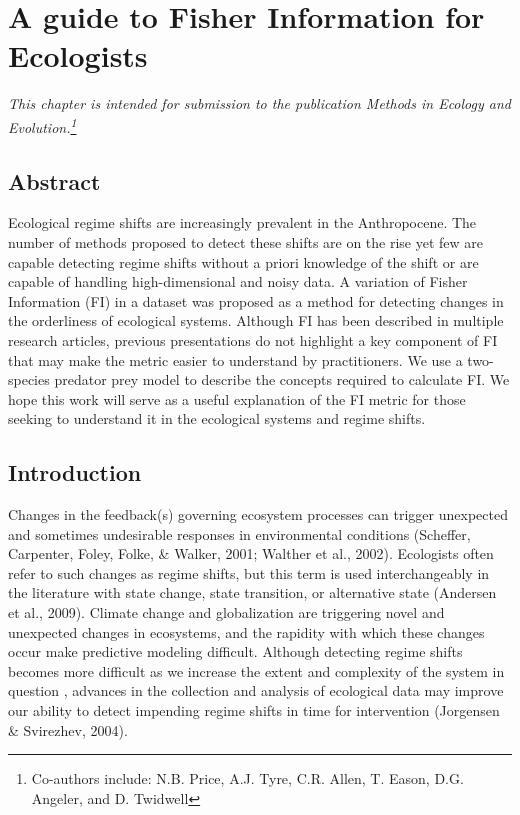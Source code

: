 \documentclass[12pt,twoside,openany]{reedthesis}
\begin{document}
\hypertarget{fiGuide}{%
\chapter{A guide to Fisher Information for Ecologists}\label{fiGuide}}

\emph{This chapter is intended for submission to the publication \emph{Methods in Ecology and Evolution}.\footnote{Co-authors include: N.B. Price, A.J. Tyre, C.R. Allen, T. Eason, D.G. Angeler, and D. Twidwell}}

\hypertarget{abstract-1}{%
\section{Abstract}\label{abstract-1}}

Ecological regime shifts are increasingly prevalent in the Anthropocene. The number of methods proposed to detect these shifts are on the rise yet few are capable detecting regime shifts without a priori knowledge of the shift or are capable of handling high-dimensional and noisy data. A variation of Fisher Information (FI) in a dataset was proposed as a method for detecting changes in the orderliness of ecological systems. Although FI has been described in multiple research articles, previous presentations do not highlight a key component of FI that may make the metric easier to understand by practitioners. We use a two-species predator prey model to describe the concepts required to calculate FI. We hope this work will serve as a useful explanation of the FI metric for those seeking to understand it in the ecological systems and regime shifts.

\hypertarget{introduction-1}{%
\section{Introduction}\label{introduction-1}}

Changes in the feedback(s) governing ecosystem processes can trigger unexpected and sometimes undesirable responses in environmental conditions (Scheffer, Carpenter, Foley, Folke, \& Walker, 2001; Walther et al., 2002). Ecologists often refer to such changes as regime shifts, but this term is used interchangeably in the literature with state change, state transition, or alternative state (Andersen et al., 2009). Climate change and globalization are triggering novel and unexpected changes in ecosystems, and the rapidity with which these changes occur make predictive modeling difficult. Although detecting regime shifts becomes more difficult as we increase the extent and complexity of the system in question , advances in the collection and analysis of ecological data may improve our ability to detect impending regime shifts in time for intervention (Jorgensen \& Svirezhev, 2004).
\end{document}
